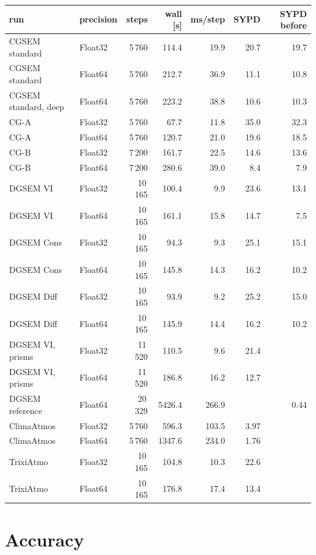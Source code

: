 \documentclass[11pt,a4paper]{article}
\begin{document}
\begin{center}
\small
\begin{tabular}{llrrrrr}
\toprule
run & precision & steps & wall [s] & ms/step & SYPD & SYPD before \\
\midrule
CGSEM standard & Float32 & 5\,760 & 114.4 & 19.9 & 20.7 & 19.7 \\
CGSEM standard & Float64 & 5\,760 & 212.7 & 36.9 & 11.1 & 10.8 \\
CGSEM standard, deep & Float64 & 5\,760 & 223.2 & 38.8 & 10.6 & 10.3 \\
CG-A           & Float32 & 5\,760 & 67.7  & 11.8 & 35.0 & 32.3 \\
CG-A           & Float64 & 5\,760 & 120.7 & 21.0 & 19.6 & 18.5 \\
CG-B           & Float32 & 7\,200 & 161.7 & 22.5 & 14.6 & 13.6 \\
CG-B           & Float64 & 7\,200 & 280.6 & 39.0 & 8.4  & 7.9 \\
DGSEM VI       & Float32 & 10\,165 & 100.4 & 9.9  & 23.6 & 13.1 \\
DGSEM VI       & Float64 & 10\,165 & 161.1 & 15.8 & 14.7 & 7.5 \\
DGSEM Cons     & Float32 & 10\,165 & 94.3  & 9.3  & 25.1 & 15.1 \\
DGSEM Cons     & Float64 & 10\,165 & 145.8 & 14.3 & 16.2 & 10.2 \\
DGSEM Diff     & Float32 & 10\,165 & 93.9  & 9.2  & 25.2 & 15.0 \\
DGSEM Diff     & Float64 & 10\,165 & 145.9 & 14.4 & 16.2 & 10.2 \\
DGSEM VI, prisms & Float32 & 11\,520 & 110.5 & 9.6 & 21.4 & \\
DGSEM VI, prisms & Float64 & 11\,520 & 186.8 & 16.2 & 12.7 & \\
DGSEM reference& Float64 & 20\,329 & 5426.4 & 266.9 & & 0.44 \\
ClimaAtmos     & Float32 & 5\,760 & 596.3 & 103.5 & 3.97 & \\
ClimaAtmos     & Float64 & 5\,760 & 1347.6 & 234.0 & 1.76 & \\
TrixiAtmo      & Float32 & 10\,165 & 104.8 & 10.3 & 22.6 & \\
TrixiAtmo      & Float64 & 10\,165 & 176.8 & 17.4 & 13.4 & \\
\bottomrule
\end{tabular}
\end{center}

\section{Accuracy}
\end{document}
